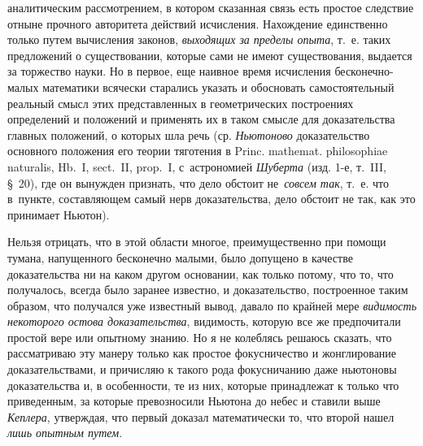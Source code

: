 аналитическим рассмотрением, в котором сказанная связь есть простое следствие
отныне прочного авторитета действий исчисления. Нахождение единственно только
путем вычисления законов, {\em выходящих за пределы опыта}, т.~е. таких
предложений о существовании, которые сами не имеют существования, выдается за
торжество науки. Но в первое, еще наивное время исчисления бесконечно-малых
математики всячески старались указать и обосновать самостоятельный реальный
смысл этих представленных в геометрических построениях определений и положений
и применять их в таком смысле для доказательства главных положений, о которых
шла речь (ср. {\em Ньютоново} доказательство основного положения его теории
тяготения в Princ. mathemat. philoso\-phiae naturalis, Hb.~I, sect.~II,
prop.~I, с~астрономией {\em Шуберта} (изд. 1-е, т.~III, \S~20), где он
вынужден признать, что дело обстоит не~{\em совсем так}, т.~е. что в~пункте,
составляющем самый нерв доказательства, дело обстоит не так,
как это принимает Ньютон).

Нельзя отрицать, что в этой области многое, преимущественно при помощи тумана,
напущенного бесконечно малыми, было допущено в качестве доказательства ни на
каком другом основании, как только потому, что то, что получалось, всегда было
заранее известно, и доказательство, построенное таким образом, что получался
уже известный вывод, давало по крайней мере {\em видимость некоторого остова
доказательства}, видимость, которую все же предпочитали простой вере или
опытному знанию. Но я не колеблясь решаюсь сказать, что рассматриваю эту манеру
только как простое фокусничество и жонглирование доказательствами, и причисляю
к такого рода фокусничанию даже ньютоновы доказательства и, в особенности, те
из них, которые принадлежат к только что приведенным, за которые превозносили
Ньютона до небес и ставили выше {\em Кеплера}, утверждая, что первый доказал
математически то, что второй нашел {\em лишь опытным путем}.

